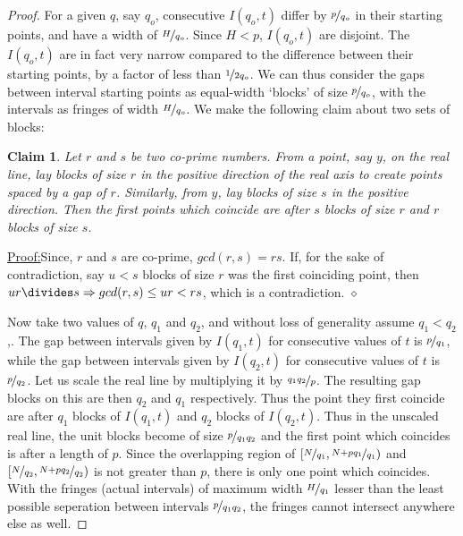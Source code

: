 \documentclass{report}
\newtheorem*{claim*}{Claim}
\newenvironment{claimproof}[1]{\par\noindent\underline{Proof:}\space#1}{\hfill $\diamond$ \vspace{3mm} \par}
\newcommand{\ignore}[1]{}
\begin{document}
\begin{proof}
For a given $q$, say $q_o$, consecutive $I(q_o,t)$ differ by $\nicefrac{p}{q_o}$ in their starting points, and have a width of $\nicefrac{H}{q_o}$. Since $H<p$, $I(q_o,t)$ are disjoint. The $I(q_o,t)$ are in fact very narrow compared to the difference between their starting points, by a factor of less than $\nicefrac{1}{2q_o}$. We can thus consider the gaps between interval starting points as equal-width `blocks' of size $\nicefrac{p}{q_o}$, with the intervals as fringes of width $\nicefrac{H}{q_o}$. We make the following claim about two sets of blocks:
%
\begin{claim*}
  Let $r$ and $s$ be two co-prime numbers. From a point, say $y$, on the real line, lay blocks of size $r$ in the positive direction of the real axis to create points spaced by a gap of $r$. Similarly, from $y$, lay blocks of size $s$ in the positive direction. Then the first points which coincide are after $s$ blocks of size $r$ and $r$ blocks of size $s$.
\end{claim*}
\begin{claimproof}
  Since, $r$ and $s$ are co-prime, $gcd(r,s)=rs$. If, for the sake of contradiction, say $u<s$ blocks of size $r$ was the first coinciding point, then $ur\divides s\Rightarrow gcd(r,s) \leq ur < rs$, which is a contradiction.
\end{claimproof}
%
Now take two values of $q$, $q_1$ and $q_2$, and without loss of generality assume $q_1<q_2$,. The gap between intervals \ignore {clarify convention earlier} given by $I(q_1,t)$ for consecutive values of $t$ is $\nicefrac{p}{q_1}$, while the gap between intervals given by $I(q_2,t)$ for consecutive values of $t$ is $\nicefrac{p}{q_2}$. Let us scale the real line by multiplying it by $\nicefrac{q_1q_2}{p}$. The resulting gap blocks on this are then $q_2$ and $q_1$ respectively. Thus the point they first coincide are after $q_1$ blocks of $I(q_1,t)$ and $q_2$ blocks of $I(q_2,t)$. Thus in the unscaled real line, the unit blocks become of size $\nicefrac{p}{q_1q_2}$ and the first point which coincides is after a length of $p$. Since the overlapping region of $[\nicefrac{N}{q_1},\nicefrac{N+pq_1}{q_1})$ and $[\nicefrac{N}{q_2},\nicefrac{N+pq_2}{q_2})$ is not greater than $p$, there is only one point which coincides. With the fringes (actual intervals) of maximum width $\nicefrac{H}{q_1}$ lesser than the least possible seperation between intervals $\nicefrac{p}{q_1q_2}$, the fringes cannot intersect anywhere else as well.


\end{proof}
\end{document}
